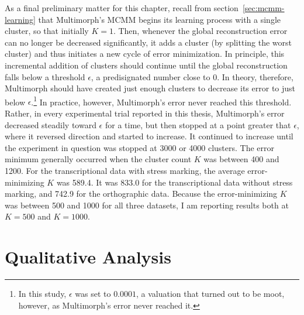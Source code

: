 As a final preliminary matter for this chapter, recall from 
section~\ref{sec:mcmm-learning}
that Multimorph's MCMM begins its learning process with a single cluster, so that initially $K = 1$.
Then, whenever the  
global reconstruction error can no longer be decreased 
significantly, it adds a cluster (by splitting the worst cluster) and thus initiates a new cycle of error minimization.
In principle, this incremental addition 
of clusters
should continue until the global reconstruction falls below a
threshold $\epsilon$, a predisignated number close to $0$.
In theory, therefore, Multimorph should have created just enough clusters to decrease its error to just below $\epsilon$.\footnote{In this study, $\epsilon$ was set to $0.0001$, a valuation that turned out to be moot, however, as Multimorph's error never reached it.}
In practice, however,
 Multimorph's error never reached this threshold.
 Rather, in every experimental trial reported in this thesis, Multimorph's 
 error decreased steadily toward $\epsilon$ for a time, but then stopped at a point greater that  $\epsilon$, 
 where it reversed direction and started to increase.  
It continued to increase until the experiment in question was stopped at 3000 or 4000 clusters.  
The error minimum generally occurred when the cluster count $K$ was between 400 and 1200. 
For the transcriptional data with stress marking, the average error-minimizing $K$ was 589.4.
It was
833.0 for the transcriptional data without stress marking,
and 742.9 for the orthographic data. Because the error-minimizing $K$ was between 500 and 1000
for all three datasets, I am reporting results both at $K = 500$ and $K = 1000$.

\section{Qualitative Analysis}
\label{sec:qual}

